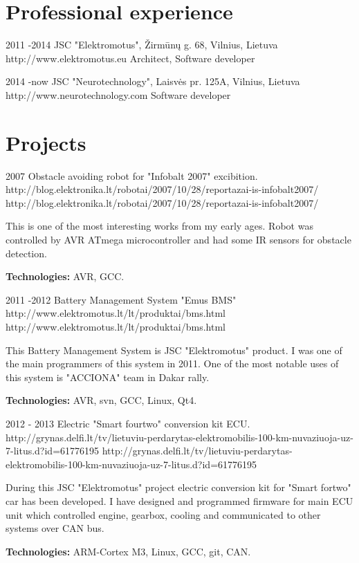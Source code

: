 \documentclass[12]{article}
\begin{document}

\section{Professional experience}

\job
{2011 -}{2014}
{JSC "Elektromotus", Žirmūnų g. 68, Vilnius, Lietuva}
{http://www.elektromotus.eu}
{Architect, Software developer}
{
}

\job
{2014 -}{now}
{JSC "Neurotechnology", Laisvės pr. 125A, Vilnius, Lietuva}
{http://www.neurotechnology.com}
{Software developer}
{
}

\section{Projects}

\job
{2007}{}
{Obstacle avoiding robot for "Infobalt 2007" excibition.}
{http://blog.elektronika.lt/robotai/2007/10/28/reportazai-is-infobalt2007/}
{http://blog.elektronika.lt/robotai/2007/10/28/reportazai-is-infobalt2007/}
{This is one of the most interesting works from my early ages.
Robot was controlled by AVR ATmega microcontroller and had some IR sensors for obstacle detection. \\
\rule{0mm}{5mm}\textbf{Technologies:} AVR, GCC.}


\job
{2011 -}{2012}
{Battery Management System "Emus BMS"}
{http://www.elektromotus.lt/lt/produktai/bms.html}
{http://www.elektromotus.lt/lt/produktai/bms.html}
{
This Battery Management System is JSC "Elektromotus" product.
I was one of the main programmers of this system in 2011.
One of the most notable uses of this system is "ACCIONA" team in Dakar rally.\\
\rule{0mm}{5mm}\textbf{Technologies:} AVR, svn, GCC, Linux, Qt4.}

\job
{2012 - }{2013}
{Electric "Smart fourtwo" conversion kit ECU.}
{http://grynas.delfi.lt/tv/lietuviu-perdarytas-elektromobilis-100-km-nuvaziuoja-uz-7-litus.d?id=61776195}
{http://grynas.delfi.lt/tv/lietuviu-perdarytas-elektromobilis-100-km-nuvaziuoja-uz-7-litus.d?id=61776195}
{
During this JSC "Elektromotus" project electric conversion kit for "Smart fortwo" car has been developed.
I have designed and programmed firmware for main ECU unit which controlled engine, gearbox, cooling and communicated to other systems over CAN bus.\\
\rule{0mm}{5mm}\textbf{Technologies:} ARM-Cortex M3, Linux, GCC, git, CAN.}
\end{document}
